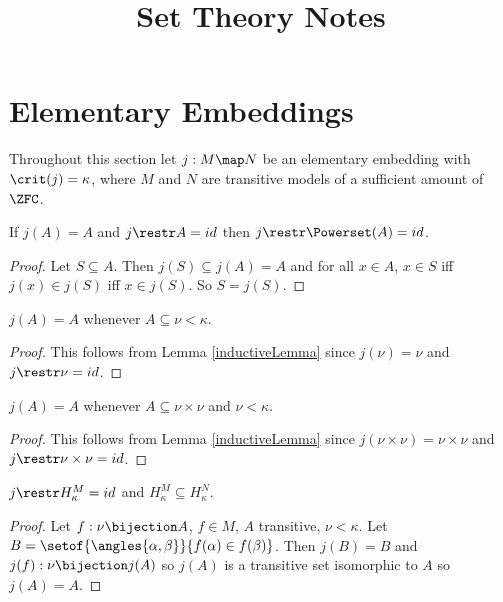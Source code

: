 \documentclass[oneside,12pt]{amsart}
\begin{document}
\title{Set Theory Notes}

\maketitle

\tableofcontents

\section{Elementary Embeddings}

Throughout this section let $j:M \map N$ be an elementary embedding with $\crit(j)=\kappa$, where $M$ and $N$ are transitive models of a sufficient amount of $\ZFC$.

\begin{lemma}
\label{inductiveLemma}
If $j(A) = A$ and $j\restr A = id$ then $j\restr \Powerset(A) = id$.
\end{lemma}
\begin{proof}
Let $S\subseteq A$. Then $j(S) \subseteq j(A) = A$ and for all $x\in A$,
$x \in S$ iff $j(x) \in j(S)$ iff $x\in j(S)$. So $S = j(S)$.
\end{proof}


\begin{corollary}
\label{subsetLemma}
$j(A) = A$ whenever $A\subseteq \nu < \kappa$.
\end{corollary}
\begin{proof}
This follows from Lemma \ref{inductiveLemma} since $j(\nu) = \nu$ and
$j \restr \nu = id$.
\end{proof}

\begin{lemma}
\label{crossProductLemma}
$j(A) = A$ whenever $A\subseteq \nu \times \nu $ and $\nu < \kappa$.
\end{lemma}
\begin{proof}
This follows from Lemma \ref{inductiveLemma} since $j(\nu \times \nu) = \nu \times \nu$ and
$j \restr \nu \times \nu = id$.
\end{proof}

\begin{lemma}
$j\restr H^{M}_{\kappa} = id$ and $H^{M}_{\kappa}\subseteq H^{N}_{\kappa}$.
\end{lemma}
\begin{proof}
Let $f:\nu\bijection A$, $f\in M$, $A$ transitive, $\nu<\kappa$. Let
$B=\setof{\angles{\alpha, \beta}}{f(\alpha) \in f(\beta)}$. Then $j(B) = B$
and $j(f):\nu\bijection j(A)$ so $j(A)$ is a transitive set isomorphic to $A$
so $j(A)=A$.
\end{proof}
\end{document}
